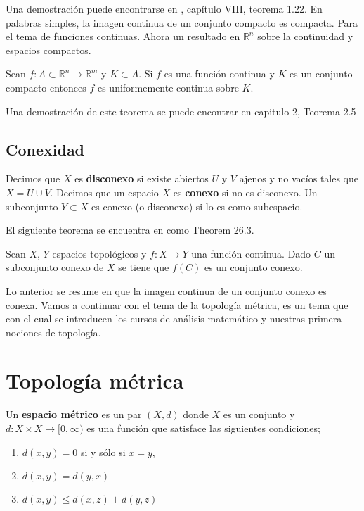 Una demostración puede encontrarse en \cite{top_prieto}, capítulo VIII, teorema 1.22. En palabras simples, la imagen continua de un conjunto compacto es compacta. Para el tema de funciones continuas. Ahora un resultado en $\mathbb{R}^n$ sobre la continuidad y espacios compactos.

\begin{te}
 Sean $f:A \subset \mathbb{R}^n \to \mathbb{R}^m$ y $K \subset A $. Si $f$ es una función continua y $K$ es un conjunto compacto entonces $f$ es uniformemente continua sobre $K$.
\end{te}

 Una demostración de este teorema se puede encontrar en \cite{cal_Paez} capitulo 2, Teorema 2.5

\subsection*{Conexidad}
 Decimos que $X$ es \textbf{disconexo} si existe abiertos $U$ y $V$ ajenos y no vacíos tales que $X = U \cup V$. Decimos que un espacio $X$ es \textbf{conexo} si no es disconexo. Un subconjunto $Y \subset X$ es conexo (o disconexo) si lo es como subespacio.

El siguiente teorema se encuentra en \cite{top_willd} como Theorem 26.3.

\begin{te}
Sean $X$, $Y$ espacios topológicos y $f:X \to Y$ una función continua. Dado $C$ un subconjunto conexo de $X$ se tiene que $f(C)$ es un conjunto conexo.
\end{te}

Lo anterior se resume en que la imagen continua de un conjunto conexo es conexa. Vamos a continuar con el tema de la topología métrica, es un tema que con el cual se introducen los cursos de análisis matemático y nuestras primera nociones de topología. 

\section*{Topología métrica}
Un \textbf{espacio métrico} es un par $(X, d)$ donde $X$ es un conjunto y $d:X \times X \to [0, \infty)$ es una función que satisface las siguientes condiciones;

\begin{enumerate}
\item $d(x,y)=0$ si y sólo si $x=y$,
\item $d(x,y)=d(y,x)$
\item $d(x,y) \leq d(x,z)+d(y,z)$
\end{enumerate}


